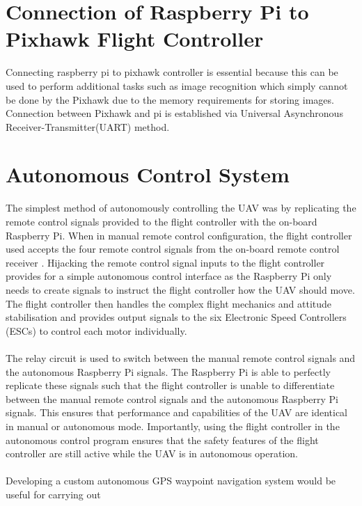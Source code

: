 \documentclass[12pt,a4paper]{report}
\begin{document}
\section{Connection of Raspberry Pi to Pixhawk Flight Controller}

\hspace*{1cm} Connecting raspberry pi to pixhawk controller is essential because this can be used to perform additional tasks such as image recognition which simply cannot be done by the Pixhawk due to the memory requirements for storing images.
Connection between Pixhawk and pi is established via Universal Asynchronous Receiver-Transmitter(UART) method.


\newpage

\section{Autonomous Control System}
\hspace*{1cm} The simplest method of autonomously controlling the UAV was by replicating the remote control
signals provided to the flight controller with the on-board Raspberry Pi. When in manual remote
control configuration, the flight controller used accepts the four remote control signals
from the on-board remote control receiver . Hijacking the remote control signal inputs to the
flight controller provides for a simple autonomous control interface as the Raspberry Pi only needs
to create signals to instruct the flight controller how the UAV should move. The flight controller
then handles the complex flight mechanics and attitude stabilisation and provides output signals to
the six Electronic Speed Controllers (ESCs) to control each motor individually.\\\\
\hspace*{1cm} The relay circuit is used to switch between the manual remote control signals
and the autonomous Raspberry Pi signals. The Raspberry Pi is able to perfectly replicate these signals
such that the flight controller is unable to differentiate between the manual remote control signals
and the autonomous Raspberry Pi signals. This ensures that performance and capabilities of the
UAV are identical in manual or autonomous mode. Importantly, using the flight controller in
the autonomous control program ensures that the safety features of the flight controller are still
active while the UAV is in autonomous operation.\\\\
\hspace*{1cm} Developing a custom autonomous GPS waypoint navigation system would be useful for carrying out
\end{document}
